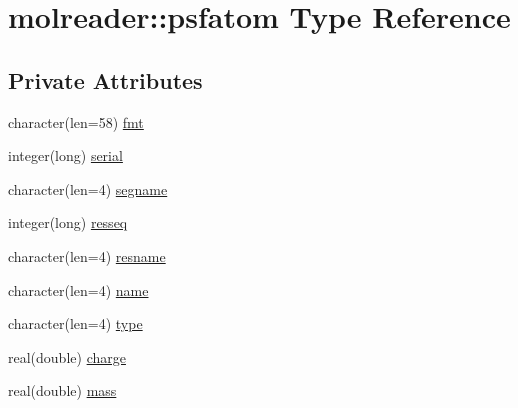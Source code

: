 \hypertarget{structmolreader_1_1psfatom}{\section{molreader\+:\+:psfatom Type Reference}
\label{structmolreader_1_1psfatom}
}
\subsection*{Private Attributes}
\begin{DoxyCompactItemize}
\item 
character(len=58) \hyperlink{structmolreader_1_1psfatom_a2c662eb006fdf85c624b28a08f65cc7b}{fmt}
\item 
integer(long) \hyperlink{structmolreader_1_1psfatom_ab524e29eb9ad1beb802719121a639fa0}{serial}
\item 
character(len=4) \hyperlink{structmolreader_1_1psfatom_aed960b86c5ddd5378e5a849a2732f650}{segname}
\item 
integer(long) \hyperlink{structmolreader_1_1psfatom_abb34c7f3cc664d0e63be1fc695413f7a}{resseq}
\item 
character(len=4) \hyperlink{structmolreader_1_1psfatom_a0bd7d6afb5d4c41d84a1e278d341ec00}{resname}
\item 
character(len=4) \hyperlink{structmolreader_1_1psfatom_a5f7ded307db07f842d21aee2dfca772b}{name}
\item 
character(len=4) \hyperlink{structmolreader_1_1psfatom_a99d2104c1a01026eef2cd329fd546f90}{type}
\item 
real(double) \hyperlink{structmolreader_1_1psfatom_abbebc3b397af2ee56c04933bc3008753}{charge}
\item 
real(double) \hyperlink{structmolreader_1_1psfatom_ae3774dcb1dec79eb1f7d5e26331056bb}{mass}
\end{DoxyCompactItemize}


